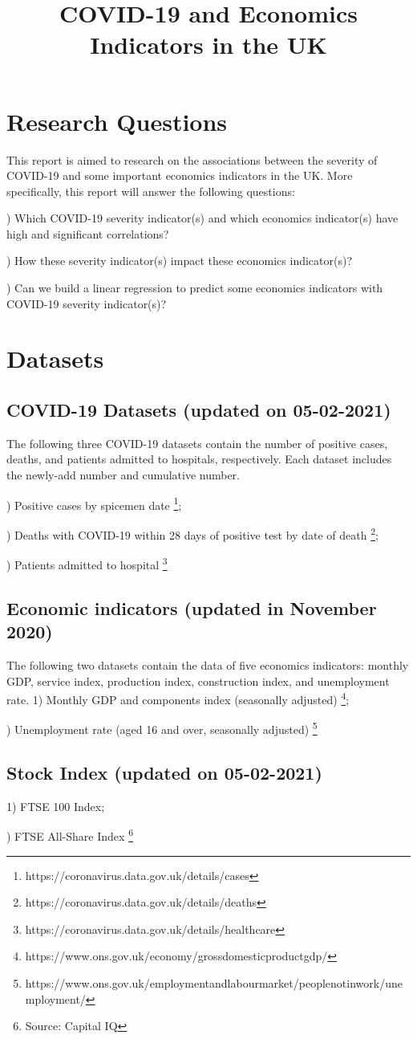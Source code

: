 \documentclass{report}
\title{COVID-19 and Economics Indicators in the UK}
\author{}
\date{}
\begin{document}
\maketitle

\section{Research Questions}
This report is aimed to research on the associations between the severity of COVID-19 and some important 
economics indicators in the UK. More specifically, this report will answer the following questions:\par
{}) Which COVID-19 severity indicator(s) and which economics indicator(s) have high and significant correlations?\par
{}) How these severity indicator(s) impact these economics indicator(s)?\par
{}) Can we build a linear regression to predict some economics indicators with COVID-19 severity indicator(s)?

\section{Datasets}
\subsection{COVID-19 Datasets (updated on 05-02-2021)}
The following three COVID-19 datasets contain the number of positive cases, deaths, and patients admitted to hospitals, 
respectively. Each dataset includes the newly-add number and cumulative number.\par
{}) Positive cases by spicemen date
\footnote[1]{https://coronavirus.data.gov.uk/details/cases};\par
{}) Deaths with COVID-19 within 28 days of positive test by date of death
\footnote[2]{https://coronavirus.data.gov.uk/details/deaths};\par
{}) Patients admitted to hospital
\footnote[3]{https://coronavirus.data.gov.uk/details/healthcare}\par

\subsection{Economic indicators (updated in November 2020)} 
The following two datasets contain the data of five economics indicators: monthly GDP, service index, 
production index, construction index, and unemployment rate. 
1) Monthly GDP and components index (seasonally adjusted)
\footnote[4]{https://www.ons.gov.uk/economy/grossdomesticproductgdp/};\par
{}) Unemployment rate (aged 16 and over, seasonally adjusted)
\footnote[5]{https://www.ons.gov.uk/employmentandlabourmarket/peoplenotinwork/unemployment/}

\subsection{Stock Index (updated on 05-02-2021)}
1) FTSE 100 Index;\par
{}) FTSE All-Share Index
\footnote[6]{Source: Capital IQ}
\end{document}
